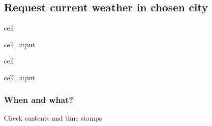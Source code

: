 \documentclass[letterpaper,10pt,english]{jupyterBook}
\begin{document}
\subsection{Request current weather in chosen city}
\label{\detokenize{2_Data_sources/APIs/OpenWeather:id2}}
\begin{sphinxuseclass}{cell}\begin{sphinxVerbatimInput}

\begin{sphinxuseclass}{cell_input}
\begin{sphinxVerbatim}[commandchars=\\\{\}]
  
\end{sphinxVerbatim}

\end{sphinxuseclass}\end{sphinxVerbatimInput}

\end{sphinxuseclass}
\begin{sphinxuseclass}{cell}\begin{sphinxVerbatimInput}

\begin{sphinxuseclass}{cell_input}
\begin{sphinxVerbatim}[commandchars=\\\{\}]
    
      
\end{sphinxVerbatim}

\end{sphinxuseclass}\end{sphinxVerbatimInput}

\end{sphinxuseclass}

\subsubsection{When and what?}
\label{\detokenize{2_Data_sources/APIs/OpenWeather:when-and-what}}
\sphinxAtStartPar
Check contents and time stamps
\end{document}
